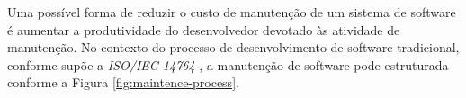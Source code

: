 \documentclass[msc,proposal,hidelot,hideabstract]{ppgccufmg} %
\begin{document}
%

Uma possível forma de reduzir o custo de manutenção de um sistema de software é
aumentar a produtividade do desenvolvedor devotado às atividade de
manutenção. No contexto do processo de desenvolvimento de software tradicional,
conforme supõe a \textit{ISO/IEC 14764} \cite{1703974}, a manutenção de
software pode estruturada conforme a Figura \ref{fig:maintence-process}.
\end{document}
